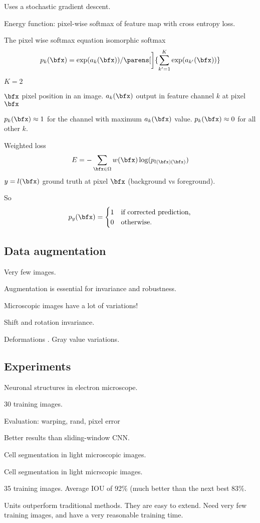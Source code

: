 Uses a stochastic gradient descent.

Energy function: pixel-wise softmax of feature map with cross entropy loss.

The pixel wise softmax equation isomorphic softmax 
\[
  p_k(\bfx)=\exp(a_k(\bfx))/\parens[\bigg]{\sum_{k'=1}^K\exp(a_{k'}(\bfx))}
\]

$K=2$

$\bfx$ pixel position in an image.
$a_k(\bfx)$ output in feature channel $k$ at pixel $\bfx$

$p_k(\bfx)\approx 1$ for the channel with maximum $a_k(\bfx)$ value.
$p_k(\bfx)\approx 0$ for all other $k$.

Weighted loss
\[
  E=-\sum_{\bfx\in\Omega}w(\bfx)\log(p_{l(\bfx)(\bfx)})
\]
$y=l(\bfx)$ ground truth at pixel $\bfx$ (background vs foreground).

So
\[
  p_y(\bfx)=\begin{cases}
    1&\text{if corrected prediction,}\\
    0&\text{otherwise.}
  \end{cases}
\]

\subsection{Data augmentation}

Very few images.

Augmentation is essential for invariance and robustness.

Microscopic images have a lot of variations!

Shift and rotation invariance.

Deformations
.
Gray value variations.

\subsection{Experiments}
Neuronal structures in electron microscope.

30 training images.

Evaluation: warping, rand, pixel error

Better results than sliding-window CNN.

Cell segmentation in light microscopic images.

Cell segmentation in light micrscopic images.

35 training images. Average IOU of 92\% (much better than the next best 83\%.

Units outperform traditional methods. They are easy to extend. Need very few
training images, and have a very reasonable training time.


